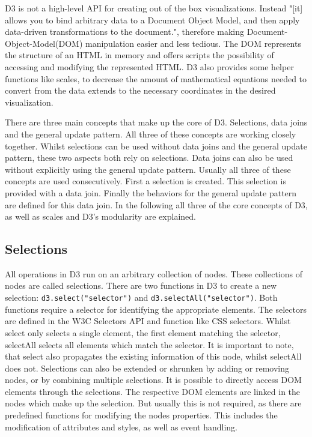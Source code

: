D3 is not a high-level API for creating out of the box visualizations. Instead "[it] allows you to bind arbitrary data to a Document Object Model, and then apply data-driven transformations to the document."\cite{d3js}, therefore making Document-Object-Model(DOM) manipulation easier and less tedious. The DOM represents the structure of an HTML in memory and offers scripts the possibility of accessing and modifying the represented HTML. D3 also provides some helper functions like scales, to decrease the amount of mathematical equations needed to convert from the data extends to the necessary coordinates in the desired visualization.

There are three main concepts that make up the core of D3. Selections, data joins and the general update pattern. All three of these concepts are working closely together. Whilst selections can be used without data joins and the general update pattern, these two aspects both rely on selections. Data joins can also be used without explicitly using the general update pattern. Usually all three of these concepts are used consecutively. First a selection is created. This selection is provided with a data join. Finally the behaviors for the general update pattern are defined for this data join.
In the following all three of the core concepts of D3, as well as scales and D3's modularity are explained.

\subsection{Selections}

All operations in D3 run on an arbitrary collection of nodes. These collections of nodes are called selections. There are two functions in D3 to create a new selection: \verb|d3.select("selector")| and \verb|d3.selectAll("selector")|. Both functions require a selector for identifying the appropriate elements. The selectors are defined in the W3C Selectors API\cite{w3c_selectors_api} and function like CSS selectors. Whilst select only selects a single element, the first element matching the selector, selectAll selects all elements which match the selector. It is important to note, that select also propagates the existing information of this node, whilst selectAll does not.
Selections can also be extended or shrunken by adding or removing nodes, or by combining multiple selections.
It is possible to directly access DOM elements through the selections. The respective DOM elements are linked in the nodes which make up the selection. But usually this is not required, as there are predefined functions for modifying the nodes properties. This includes the modification of attributes and styles, as well as event handling. 

